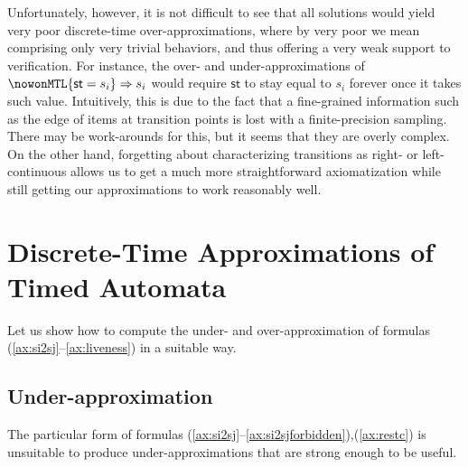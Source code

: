 \documentclass[a4paper]{article}
\newcommand{\frf}[1]{(\ref{#1})}
\newcommand{\fsrf}[2]{(\ref{#1}--\ref{#2})}
\newcommand{\st}{\mathsf{st}}
\theoremstyle{plain}
\theoremstyle{definition}
\begin{document}
Unfortunately, however, it is not difficult to see that all solutions would yield very poor discrete-time over-ap\-prox\-i\-ma\-tions, where by very poor we mean comprising only very trivial behaviors, and thus offering a very weak support to verification.
For instance, the over- and under-ap\-prox\-i\-ma\-tions of $\nowonMTL{\st = s_i} \Rightarrow s_i$ would require $\st$ to stay equal to $s_i$ forever once it takes such value.
Intuitively, this is due to the fact that a fine-grained information such as the edge of items at transition points is lost with a finite-precision sampling.
There may be work-arounds for this, but it seems that they are overly complex.
On the other hand, forgetting about characterizing transitions as right- or left-continuous allows us to get a much more straightforward axiomatization while still getting our approximations to work reasonably well.







\section{Discrete-Time Approximations of Timed Automata} \label{sec:TA-approx}
Let us show how to compute the under- and over-ap\-prox\-i\-ma\-tion of formulas \fsrf{ax:si2sj}{ax:liveness} in a suitable way.




\subsection{Under-ap\-prox\-i\-ma\-tion}

The particular form of formulas \fsrf{ax:si2sj}{ax:si2sjforbidden},\frf{ax:restc} is unsuitable to produce under-ap\-prox\-i\-ma\-tions that are strong enough to be useful.
\end{document}
